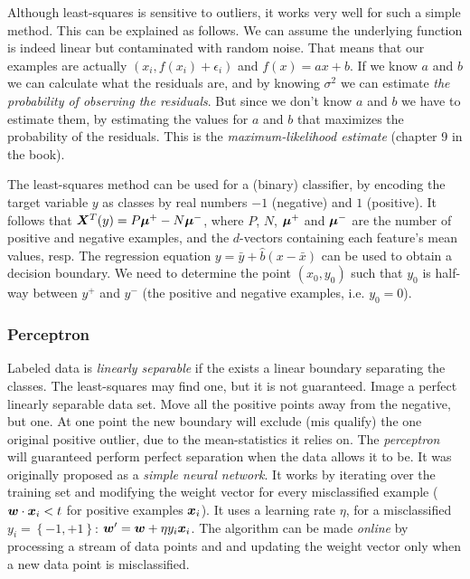 Although least-squares is sensitive to outliers, it works very well for such a simple method.
This can be explained as follows.
We can assume the underlying function is indeed linear but contaminated with random noise.
That means that our examples are actually $(x_i, f(x_i) + \epsilon_i)$ and $f(x) = ax + b$.
If we know $a$ and $b$ we can calculate what the residuals are, and by knowing $\sigma^2$ we can estimate \emph{the probability of observing the residuals}.
But since we don't know $a$ and $b$ we have to estimate them, by estimating the values for $a$ and $b$ that maximizes the probability of the residuals.
This is the \emph{maximum-likelihood estimate} (chapter 9 in the book).

The least-squares method can be used for a (binary) classifier, by encoding the target variable $y$ as classes by real numbers $-1$ (negative) and $1$ (positive).
It follows that $\matrixsym{X}^T\vectorsym(y) = P \vectorsym{\mu^+} - N \vectorsym{\mu^-}$, where $P$, $N$, $\vectorsym{\mu^+}$ and $\vectorsym{\mu^-}$ are the number of positive and negative examples, and the $d$-vectors containing each feature's mean values, resp.
The regression equation $y = \bar{y} + \hat{b}(x - \bar{x})$ can be used to obtain a decision boundary.
We need to determine the point $(x_0, y_0)$ such that $y_0$ is half-way between $y^+$ and $y^-$ (the positive and negative examples, i.e. $y_0 = 0$).


\subsubsection{Perceptron}\label{perceptron}
Labeled data is \emph{linearly separable} if the exists a linear boundary separating the classes.
The least-squares may find one, but it is not guaranteed.
Image a perfect linearly separable data set.
Move all the positive points away from the negative, but one.
At one point the new boundary will exclude (mis qualify) the one original positive outlier, due to the mean-statistics it relies on.
The \emph{perceptron} will guaranteed perform perfect separation when the data allows it to be.
It was originally proposed as a \emph{simple neural network}.
It works by iterating over the training set and modifying the weight vector for every misclassified example ($\vectorsym{w} \cdot \vectorsym{x}_i < t$ for positive examples $\vectorsym{x}_i$).
It uses a learning rate $\eta$, for a misclassified $y_i = \left\{-1,+1\right\}$: $\vectorsym{w}' = \vectorsym{w} + \eta y_i \vectorsym{x}_i$.
The algorithm can be made \emph{online} by processing a stream of data points and and updating the weight vector only when a new data point is misclassified.

